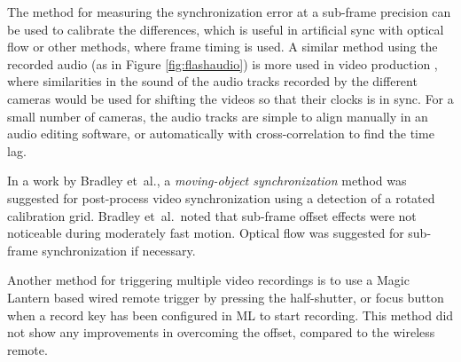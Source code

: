 


The method for measuring the synchronization error at a sub-frame precision can be used to calibrate the differences, which is useful in artificial sync with optical flow or other methods, where frame timing is used.
A similar method using the recorded audio (as in Figure \ref{fig:flashaudio}) is more used in video production \cite{pluraleyes,premierepromerge}, where similarities in the sound of the audio tracks recorded by the different cameras would be used for shifting the videos so that their clocks is in sync.
For a small number of cameras, the audio tracks are simple to align manually in an audio editing software, or automatically with cross-correlation to find the time lag.

In a work by Bradley et~al., a \emph{moving-object synchronization} method \cite{bradley2008markerless} was suggested for post-process video synchronization using a detection of a rotated calibration grid.
Bradley et~al.\ noted that sub-frame offset effects were not noticeable during moderately fast motion.
Optical flow was suggested for sub-frame synchronization if necessary.

Another method for triggering multiple video recordings is to use a Magic Lantern based wired remote trigger by pressing the half-shutter, or focus button when a record key has been configured in ML to start recording.
This method did not show any improvements in overcoming the offset, compared to the wireless remote.

